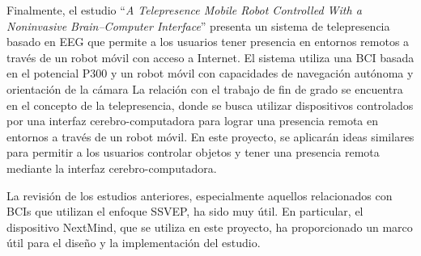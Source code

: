 Finalmente, el estudio ``\textit{A Telepresence Mobile Robot Controlled With a Noninvasive Brain–Computer Interface}'' presenta un sistema de telepresencia basado en EEG que permite a los usuarios tener presencia en entornos remotos a través de un robot móvil con acceso a Internet. El sistema utiliza una BCI basada en el potencial P300 y un robot móvil con capacidades de navegación autónoma y orientación de la cámara \cite{TelepresenceMobileRobotBCI} La relación con el trabajo de fin de grado se encuentra en el concepto de la telepresencia, donde se busca utilizar dispositivos controlados por una interfaz cerebro-computadora para lograr una presencia remota en entornos a través de un robot móvil. En este proyecto, se aplicarán ideas similares para permitir a los usuarios controlar objetos y tener una presencia remota mediante la interfaz cerebro-computadora.



La revisión de los estudios anteriores, especialmente aquellos relacionados con BCIs que utilizan el enfoque SSVEP, ha sido muy útil. En particular, el dispositivo NextMind, que se utiliza en este proyecto, ha proporcionado un marco útil para el diseño y la implementación del estudio.